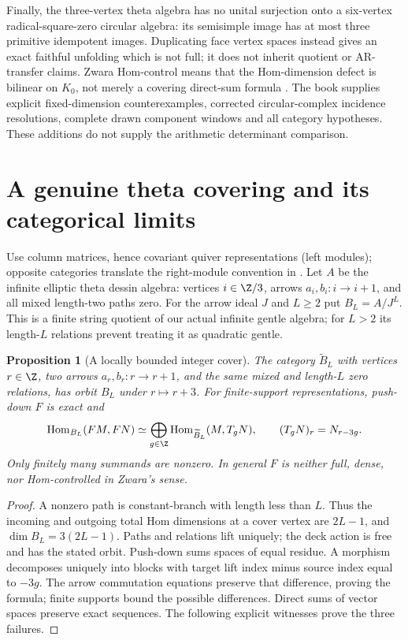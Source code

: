 \documentclass[11pt]{article}
\newtheorem{proposition}[theorem]{Proposition}
\theoremstyle{definition}\newtheorem{definition}[theorem]{Definition}
\theoremstyle{remark}\newtheorem{remark}[theorem]{Remark}
\begin{document}
Finally, the three-vertex theta algebra has no unital surjection onto a six-vertex radical-square-zero circular algebra: its semisimple image has at most three primitive idempotent images. Duplicating face vertex spaces instead gives an exact faithful unfolding which is not full; it does not inherit quotient or AR-transfer claims. Zwara Hom-control means that the Hom-dimension defect is bilinear on $K_0$, not merely a covering direct-sum formula \cite{ZwaraCorrected,RiedtmannZwaraCorrected}. The book supplies explicit fixed-dimension counterexamples, corrected circular-complex incidence resolutions, complete drawn component windows and all category hypotheses. These additions do not supply the arithmetic determinant comparison.


\section{A genuine theta covering and its categorical limits}
\label{cover:section}
Use column matrices, hence covariant quiver representations (left modules);
opposite categories translate the right-module convention in
\cite{CoveringLecture2026}. Let $A$ be the infinite elliptic theta dessin
algebra: vertices $i\in\Z/3$, arrows $a_i,b_i:i\to i+1$, and all mixed
length-two paths zero. For the arrow ideal $J$ and $L\geq2$ put $B_L=A/J^L$.
This is a finite string quotient of our actual infinite gentle algebra;
for $L>2$ its length-$L$ relations prevent treating it as quadratic gentle.

\begin{proposition}[A locally bounded integer cover]\label{cover:hom}
The category $\widetilde B_L$ with vertices $r\in\Z$, two arrows
$a_r,b_r:r\to r+1$, and the same mixed and length-$L$ zero relations,
has orbit $B_L$ under $r\mapsto r+3$. For finite-support representations,
push-down $F$ is exact and
\[
 \operatorname{Hom}_{B_L}(FM,FN)
 \simeq\bigoplus_{g\in\Z}
       \operatorname{Hom}_{\widetilde B_L}(M,T_gN),\qquad
 (T_gN)_r=N_{r-3g}.
\]
Only finitely many summands are nonzero. In general $F$ is neither full,
dense, nor Hom-controlled in Zwara's sense.
\end{proposition}
\begin{proof}
A nonzero path is constant-branch with length less than $L$.
Thus the incoming and outgoing total Hom dimensions at a cover vertex are
$2L-1$, and $\dim B_L=3(2L-1)$. Paths and relations lift uniquely; the
deck action is free and has the stated orbit. Push-down sums spaces of equal
residue. A morphism decomposes uniquely into blocks with target lift index
minus source index equal to $-3g$. The arrow commutation equations preserve
that difference, proving the formula; finite supports bound the possible
differences. Direct sums of vector spaces preserve exact sequences.
The following explicit witnesses prove the three failures.
\end{proof}
\end{document}
